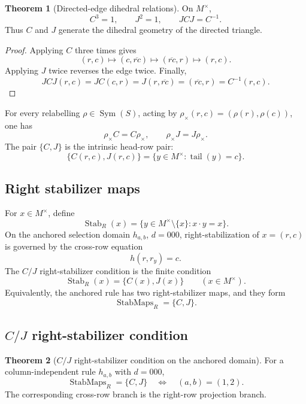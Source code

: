\documentclass[11pt]{article}
\theoremstyle{definition}
\newtheorem{theorem}{Theorem}[section]
\begin{document}
\begin{theorem}[Directed-edge dihedral relations]
\label{thm:11.1}
On \(M^\times\),
\[
C^3=1,
\qquad
J^2=1,
\qquad
JCJ=C^{-1}.
\]
Thus \(C\) and \(J\) generate the dihedral geometry of the directed triangle.
\end{theorem}

\begin{proof}
Applying \(C\) three times gives
\[
(r,c)\mapsto(c,\overline{rc})\mapsto(\overline{rc},r)\mapsto(r,c).
\]
Applying \(J\) twice reverses the edge twice.  Finally,
\[
JCJ(r,c)=JC(c,r)=J(r,\overline{rc})=(\overline{rc},r)=C^{-1}(r,c).
\]
\end{proof}

For every relabelling \(\rho\in\operatorname{Sym}(S)\), acting by
\(\rho_\times(r,c)=(\rho(r),\rho(c))\), one has
\[
\rho_\times C=C\rho_\times,
\qquad
\rho_\times J=J\rho_\times.
\]
The pair \(\{C,J\}\) is the intrinsic head-row pair:
\[
\{C(r,c),J(r,c)\}
=
\{y\in M^\times: \operatorname{tail}(y)=c\}.
\]

\subsection{Right stabilizer maps}\label{right-stabilizer-maps}\label{right-stabilizer-transitions}

For \(x\in M^\times\), define
\[
\operatorname{Stab}_R(x)=\{y\in M^\times\setminus\{x\}:x\cdot y=x\}.
\]
On the anchored selection domain \(h_{a,b}\), \(d=000\), right-stabilization of
\(x=(r,c)\) is governed by the cross-row equation
\[
h(r,r_y)=c.
\]
The \(C/J\) right-stabilizer condition is the finite condition
\[
\operatorname{Stab}_R(x)=\{C(x),J(x)\}
\qquad(x\in M^\times).
\]
Equivalently, the anchored rule has two right-stabilizer maps, and they form
\[
\operatorname{StabMaps}_{R}=\{C,J\}.
\]

\subsection[C/J right-stabilizer condition]{\(C/J\) right-stabilizer condition}\label{cj-right-stabilizer-condition}\label{cj-right-stabilizer-selection}

\begin{theorem}[\(C/J\) right-stabilizer condition on the anchored domain]
\label{thm:12.2}
For a column-independent rule \(h_{a,b}\) with \(d=000\),
\[
\operatorname{StabMaps}_{R}=\{C,J\}
\quad\Longleftrightarrow\quad
(a,b)=(1,2).
\]
The corresponding cross-row branch is the right-row projection branch.
\end{theorem}
\end{document}
